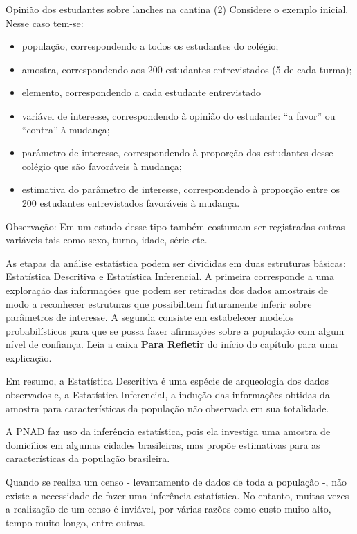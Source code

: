 \begin{example}{Opinião dos estudantes sobre lanches na cantina (2)}
Considere o exemplo inicial. Nesse caso tem-se:

\begin{itemize}
\item população, correspondendo a todos os estudantes do colégio;
\item amostra, correspondendo aos 200 estudantes entrevistados (5 de cada turma);
\item elemento, correspondendo a cada estudante entrevistado
\item variável de interesse, correspondendo à opinião do estudante: “a favor”{} ou “contra”{} à mudança;
\item parâmetro de interesse, correspondendo à proporção dos estudantes desse colégio que são favoráveis à mudança;
\item estimativa do parâmetro de interesse, correspondendo à proporção entre os 200 estudantes entrevistados favoráveis à mudança.
\end{itemize}

Observação: Em um estudo desse tipo também costumam ser registradas outras variáveis tais como sexo, turno, idade, série etc.
\end{example}

As etapas da análise estatística podem ser divididas em duas estruturas básicas: Estatística Descritiva e Estatística Inferencial. A primeira corresponde a uma exploração das informações que podem ser retiradas dos dados amostrais de modo a reconhecer estruturas que possibilitem futuramente inferir sobre parâmetros de interesse. A segunda consiste em estabelecer modelos probabilísticos para que se possa fazer afirmações sobre a população com algum nível de confiança. Leia a caixa \textbf{Para Refletir} do início do capítulo para uma explicação.

Em resumo, a Estatística Descritiva é uma espécie de arqueologia dos dados observados e, a Estatística Inferencial, a indução das informações obtidas da amostra para características da população não observada em sua totalidade.

A PNAD faz uso da inferência estatística, pois ela investiga uma amostra de domicílios em algumas cidades brasileiras, mas propõe estimativas para as características da população brasileira.

Quando se realiza um censo - levantamento de dados de toda a população -, não existe a necessidade de fazer uma inferência estatística. No entanto, muitas vezes a realização de um censo é inviável, por várias razões como custo muito alto, tempo muito longo, entre outras.

